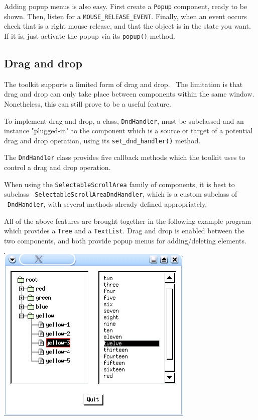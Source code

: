 Adding popup menus is also easy. First create a \texttt{Popup}
component, ready to be shown. Then, listen for a
\texttt{MOUSE\_RELEASE\_EVENT}. Finally, when an event occurs check
that is a right mouse release, and that the object is in the state you
want. If it is, just activate the popup via its \texttt{popup()}
method.

\subsection{Drag and drop}

The toolkit supports a limited form of drag and drop. \ The limitation
is that drag and drop can only take place between components within the
same window. Nonetheless, this can still prove to be a useful feature.

To implement drag and drop, a class, \texttt{DndHandler}, must be
subclassed and an instance "plugged-in" to
the component which is a source or target of a potential drag and drop
operation, using its \texttt{set\_dnd\_handler()} method.

The \texttt{DndHandler} class provides five callback methods which the
toolkit uses to control a drag and drop operation.

When using the \texttt{SelectableScrollArea} family of components, it is
best to subclass \ \texttt{SelectableScrollAreaDndHandler}, which is a
custom subclass of \ \texttt{DndHandler}, with several methods already
defined appropriately.

All of the above features are brought together in the following example
program which provides a \texttt{Tree} and a \texttt{TextList}. Drag
and drop is enabled between the two components, and both provide popup
menus for adding/deleting elements.

\bigskip

\bigskip

\begin{center}
\includegraphics[width=3.7189in,height=3.3846in]{ub-img/ub-img59.jpg}
\end{center}

